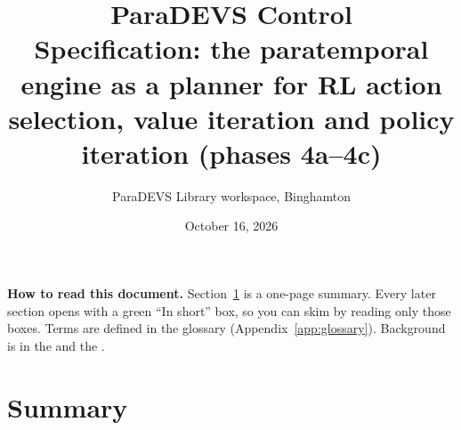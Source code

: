 \documentclass[11pt]{article}
\title{\textbf{ParaDEVS Control}\\[4pt]\large Specification: the paratemporal engine as a planner for RL action selection,
value iteration and policy iteration (phases 4a--4c)}
\author{ParaDEVS Library workspace, Binghamton}
\date{October 16, 2026}
\theoremstyle{plain}
\begin{document}
\maketitle

\begin{center}
\begin{minipage}{0.88\linewidth}\small
\textbf{How to read this document.} Section~\ref{sec:summary} is a one-page summary. Every later section opens with a
green ``In short'' box, so you can skim by reading only those boxes. Terms are defined in the glossary
(Appendix~\ref{app:glossary}). Background is in the  and the
.
\end{minipage}
\end{center}

\relateddocs

\tableofcontents
\newpage

\section{Summary}\label{sec:summary}
\end{document}
